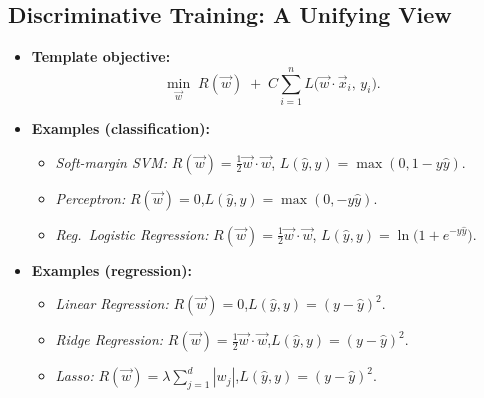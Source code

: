 \subsection{Discriminative Training: A Unifying View}
\begin{itemize}
    \item \textbf{Template objective:}
    \[
      \min_{\vec{w}}\; R(\vec{w}) \;+\; C\sum_{i=1}^n L\!\big(\vec{w}\!\cdot\!\vec{x}_i,\,y_i\big).
    \]
    \item \textbf{Examples (classification):}
    \begin{itemize}
        \item \textit{Soft-margin SVM:} $R(\vec{w})=\tfrac{1}{2}\vec{w}\!\cdot\!\vec{w}$,\quad
        $L(\hat{y},y)=\max(0,1-y\hat{y})$.
        \item \textit{Perceptron:} $R(\vec{w})=0$,\quad $L(\hat{y},y)=\max(0,-y\hat{y})$.
        \item \textit{Reg.\ Logistic Regression:} $R(\vec{w})=\tfrac{1}{2}\vec{w}\!\cdot\!\vec{w}$,\quad
        $L(\hat{y},y)=\ln\!\big(1+e^{-y\hat{y}}\big)$.
    \end{itemize}
    \item \textbf{Examples (regression):}
    \begin{itemize}
        \item \textit{Linear Regression:} $R(\vec{w})=0$,\quad $L(\hat{y},y)=(y-\hat{y})^2$.
        \item \textit{Ridge Regression:} $R(\vec{w})=\tfrac{1}{2}\vec{w}\!\cdot\!\vec{w}$,\quad $L(\hat{y},y)=(y-\hat{y})^2$.
        \item \textit{Lasso:} $R(\vec{w})=\lambda\sum_{j=1}^d |w_j|$,\quad $L(\hat{y},y)=(y-\hat{y})^2$.
    \end{itemize}
\end{itemize}

